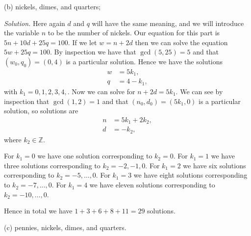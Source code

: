 \documentclass{article}
\newcommand{\Z}{\mathbb{Z}}
\begin{document}
\vspace{5mm}

(b) nickels, dimes, and quarters;

\textit{Solution.}
Here again $d$ and $q$ will have the same meaning, and we will introduce
the variable $n$ to be the number of nickels. Our equation for this part
is $5n + 10d + 25q = 100$. If we let $w = n + 2 d$ then we can solve the
equation $5w + 25q = 100$. By inspection we have that $\gcd(5, 25) = 5$
and that $(w_0, q_0) = (0, 4)$ is a particular solution. Hence we have
the solutions
%
\begin{align*}
    w &= 5 k_1, \\
    q &= 4 - k_1
    ,
\end{align*}
%
with $k_1 = 0, 1, 2, 3, 4,$. Now we can solve for $n + 2 d = 5 k_1$. We
can see by inspection that $\gcd(1, 2) = 1$ and that
$(n_0, d_0) = (5k_1, 0)$ is a particular solution, so solutions are
%
\begin{align*}
    n &= 5 k_1  + 2 k_2, \\
    d &= - k_2
    ,
\end{align*}
%
where $k_2 \in \Z$.

For $k_1 = 0$ we have one solution corresponding to $k_2 = 0$.
For $k_1 = 1$ we have three solutions corresponding to
$k_2 = -2, -1, 0$. For $k_1 = 2$ we have six solutions corresponding to
$k_2 = -5, \ldots, 0$. For $k_1 = 3$ we have eight solutions corresponding to
$k_2 = -7, \ldots, 0$. For $k_1 = 4$ we have eleven solutions corresponding to
$k_2 = -10, \ldots, 0$.

Hence in total we have $1 + 3 + 6 + 8 + 11 = 29$ solutions.

\vspace{5mm}

(c) pennies, nickels, dimes, and quarters.
\end{document}
